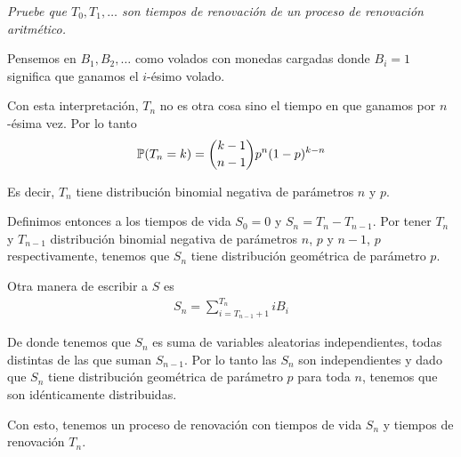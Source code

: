 ﻿\emph{
    Pruebe que $T_0, T_1,\dots$ son tiempos de renovación de un proceso de renovación aritmético.
}
\afterstatement\pn

    Pensemos en $B_1, B_2, \dots$ como volados con monedas cargadas donde $B_i = 1$ significa que ganamos el
    $i$-ésimo volado.\pn
    
    Con esta interpretación, $T_n$ no es otra cosa sino el tiempo en que ganamos por $n$-ésima vez. Por lo tanto\pn
    \begin{align}
        \P(T_{n} = k) = \binom{k-1}{n-1} p^n (1-p)^{k-n}
    \end{align}
    
    Es decir, $T_n$ tiene distribución binomial negativa de parámetros $n$ y $p$.\pn
    
    Definimos entonces a los tiempos de vida $S_0 = 0$ y $S_n = T_n - T_{n-1}$. Por tener $T_n$ y $T_{n-1}$ distribución
    binomial negativa de parámetros $n$, $p$ y $n-1$, $p$ respectivamente, tenemos que $S_n$ tiene distribución
    geométrica de parámetro $p$.\pn
    
    Otra manera de escribir a $S$ es
    \begin{align}
        S_n = \sum_{i = T_{n-1} + 1}^{T_n} i B_i
    \end{align}
    
    De donde tenemos que $S_n$ es suma de variables aleatorias independientes, todas distintas de las que suman $S_{n-1}$.
    Por lo tanto las $S_n$ son independientes y dado que $S_n$ tiene distribución geométrica de parámetro $p$ para toda
    $n$, tenemos que son idénticamente distribuidas.\pn
    
    Con esto, tenemos un proceso de renovación con tiempos de vida $S_n$ y tiempos de renovación $T_n$.
